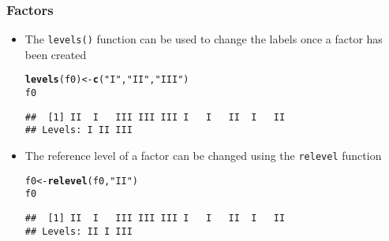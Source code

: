 \documentclass[paper=screen,mathserif]{beamer}\usepackage[]{graphicx}\usepackage[]{color}
\makeatletter
\newcommand{\hlstr}[1]{\textcolor[rgb]{0.192,0.494,0.8}{#1}}%
\newcommand{\hlstd}[1]{\textcolor[rgb]{0.345,0.345,0.345}{#1}}%
\newcommand{\hlkwb}[1]{\textcolor[rgb]{0.69,0.353,0.396}{#1}}%
\newcommand{\hlkwd}[1]{\textcolor[rgb]{0.737,0.353,0.396}{\textbf{#1}}}%
\newenvironment{kframe}{%
 \def\at@end@of@kframe{}%
 \ifinner\ifhmode%
  \def\at@end@of@kframe{\end{minipage}}%
  \begin{minipage}{\columnwidth}%
 \fi\fi%
 \def\FrameCommand##1{\hskip\@totalleftmargin \hskip-\fboxsep
 \colorbox{shadecolor}{##1}\hskip-\fboxsep
     \hskip-\linewidth \hskip-\@totalleftmargin \hskip\columnwidth}%
 \MakeFramed {\advance\hsize-\width
   \@totalleftmargin\z@ \linewidth\hsize
   \@setminipage}}%
 {\par\unskip\endMakeFramed%
 \at@end@of@kframe}
\newenvironment{knitrout}{}{} %
\newcommand{\ft}[1]{\frametitle{#1}}
\makeatother
\begin{document}
\begin{frame}[fragile]
  \ft{Factors}
  
  \begin{itemize}
  \item The \verb=levels()= function can be used to change the labels
    once a factor has been created
\begin{knitrout}\scriptsize
{}\color{fgcolor}\begin{kframe}
\begin{alltt}
\hlkwd{levels}\hlstd{(f0)} \hlkwb{<-} \hlkwd{c}\hlstd{(}\hlstr{"I"}\hlstd{,} \hlstr{"II"}\hlstd{,} \hlstr{"III"}\hlstd{)}
\hlstd{f0}
\end{alltt}
\begin{verbatim}
##  [1] II  I   III III III I   I   II  I   II 
## Levels: I II III
\end{verbatim}
\end{kframe}
\end{knitrout}
\item The reference level of a factor can be changed using the
  \verb=relevel= function
\begin{knitrout}\scriptsize
{}\color{fgcolor}\begin{kframe}
\begin{alltt}
\hlstd{f0} \hlkwb{<-} \hlkwd{relevel}\hlstd{(f0,} \hlstr{"II"}\hlstd{)}
\hlstd{f0}
\end{alltt}
\begin{verbatim}
##  [1] II  I   III III III I   I   II  I   II 
## Levels: II I III
\end{verbatim}
\end{kframe}
\end{knitrout}

  \end{itemize}
\end{frame}
\end{document}
